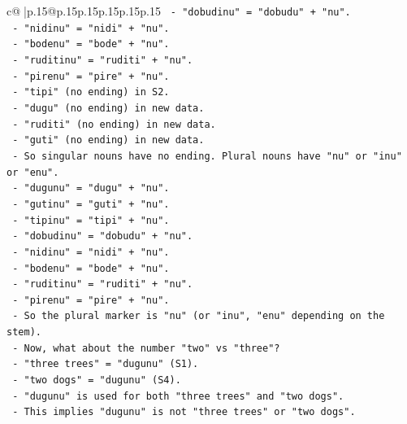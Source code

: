 \documentclass{article}
\begin{document}
{\begin{supertabular}{c@{$\;$}|p{.15\linewidth}@{}p{.15\linewidth}p{.15\linewidth}p{.15\linewidth}p{.15\linewidth}p{.15\linewidth}}
{{{\texttt{                  {-} "dobudinu" = "dobudu" + "nu".} \\
\texttt{                  {-} "nidinu" = "nidi" + "nu".} \\
\texttt{                  {-} "bodenu" = "bode" + "nu".} \\
\texttt{                  {-} "ruditinu" = "ruditi" + "nu".} \\
\texttt{                  {-} "pirenu" = "pire" + "nu".} \\
\texttt{                  {-} "tipi" (no ending) in S2.} \\
\texttt{                  {-} "dugu" (no ending) in new data.} \\
\texttt{                  {-} "ruditi" (no ending) in new data.} \\
\texttt{                  {-} "guti" (no ending) in new data.} \\
\texttt{                  {-} So singular nouns have no ending. Plural nouns have "nu" or "inu" or "enu".} \\
\texttt{                  {-} "dugunu" = "dugu" + "nu".} \\
\texttt{                  {-} "gutinu" = "guti" + "nu".} \\
\texttt{                  {-} "tipinu" = "tipi" + "nu".} \\
\texttt{                  {-} "dobudinu" = "dobudu" + "nu".} \\
\texttt{                  {-} "nidinu" = "nidi" + "nu".} \\
\texttt{                  {-} "bodenu" = "bode" + "nu".} \\
\texttt{                  {-} "ruditinu" = "ruditi" + "nu".} \\
\texttt{                  {-} "pirenu" = "pire" + "nu".} \\
\texttt{                  {-} So the plural marker is "nu" (or "inu", "enu" depending on the stem).} \\
\texttt{                  {-} Now, what about the number "two" vs "three"?} \\
\texttt{                  {-} "three trees" = "dugunu" (S1).} \\
\texttt{                  {-} "two dogs" = "dugunu" (S4).} \\
\texttt{                  {-} "dugunu" is used for both "three trees" and "two dogs".} \\
\texttt{                  {-} This implies "dugunu" is not "three trees" or "two dogs".} \\
}}}
\end{supertabular}}
\end{document}
